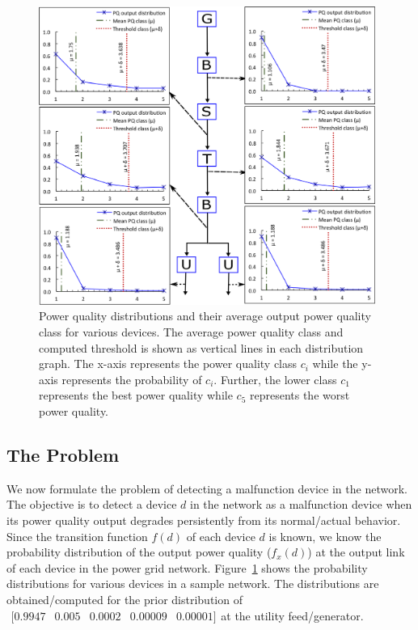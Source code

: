 \begin{figure}[!p]
\centering
\includegraphics[width=0.98\textwidth]{PQOutputDistribution} \vspace{1cm}
\caption{Power quality distributions and their average output power quality class for various devices. The average power quality class and computed threshold is shown as vertical lines in each  distribution graph. The x-axis represents the power quality class $c_i$ while the y-axis represents the probability of $c_i$. Further, the lower class $c_1$ represents the best power quality while $c_5$ represents the worst power quality.}
\label{fig:outputPQDistributions}
\end{figure}

\subsection{The Problem}
We now formulate the problem of detecting a malfunction device in the network. The objective is to detect a device $d$ in the network as a malfunction device when its power quality output degrades persistently from its normal/actual behavior. Since the transition function $f(d)$ of each device $d$ is known, we know the probability distribution of the output power quality ($f_x\left(d\right)$) at the output link of each device in the power grid network. Figure~\ref{fig:outputPQDistributions} shows the probability distributions for various devices in a sample network. The distributions are obtained/computed for the prior distribution of$\begin{array}{ccccc}[0.9947 & 0.005 & 0.0002 & 0.00009 & 0.00001]\end{array}$at the utility feed/generator.

